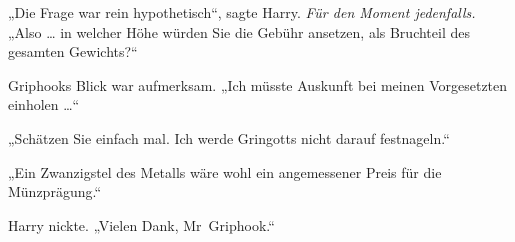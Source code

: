 „Die Frage war rein hypothetisch“, sagte Harry. \emph{Für den Moment jedenfalls.}
„Also … in welcher Höhe würden Sie die Gebühr ansetzen, als Bruchteil des gesamten Gewichts?“

Griphooks Blick war aufmerksam.
„Ich müsste Auskunft bei meinen Vorgesetzten einholen …“

„Schätzen Sie einfach mal. Ich werde Gringotts nicht darauf festnageln.“

„Ein Zwanzigstel des Metalls wäre wohl ein angemessener Preis für die Münzprägung.“

Harry nickte.
„Vielen Dank, Mr~Griphook.“

